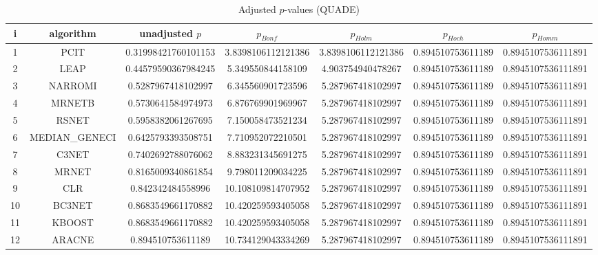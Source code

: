 \documentclass[a4paper,10pt]{article}
\begin{document}
\begin{landscape}
\begin{table}[!htp]
\centering\scriptsize
\caption{Adjusted $p$-values (QUADE)}
\begin{tabular}{ccccccc}
i&algorithm&unadjusted $p$&$p_{Bonf}$&$p_{Holm}$&$p_{Hoch}$&$p_{Homm}$\\
\hline
1&PCIT&0.31998421760101153&3.8398106112121386&3.8398106112121386&0.894510753611189&0.8945107536111891\\
2&LEAP&0.44579590367984245&5.349550844158109&4.903754940478267&0.894510753611189&0.8945107536111891\\
3&NARROMI&0.5287967418102997&6.345560901723596&5.287967418102997&0.894510753611189&0.8945107536111891\\
4&MRNETB&0.5730641584974973&6.876769901969967&5.287967418102997&0.894510753611189&0.8945107536111891\\
5&RSNET&0.5958382061267695&7.150058473521234&5.287967418102997&0.894510753611189&0.8945107536111891\\
6&MEDIAN_GENECI&0.6425793393508751&7.710952072210501&5.287967418102997&0.894510753611189&0.8945107536111891\\
7&C3NET&0.7402692788076062&8.883231345691275&5.287967418102997&0.894510753611189&0.8945107536111891\\
8&MRNET&0.8165009340861854&9.798011209034225&5.287967418102997&0.894510753611189&0.8945107536111891\\
9&CLR&0.842342484558996&10.108109814707952&5.287967418102997&0.894510753611189&0.8945107536111891\\
10&BC3NET&0.8683549661170882&10.420259593405058&5.287967418102997&0.894510753611189&0.8945107536111891\\
11&KBOOST&0.8683549661170882&10.420259593405058&5.287967418102997&0.894510753611189&0.8945107536111891\\
12&ARACNE&0.894510753611189&10.734129043334269&5.287967418102997&0.894510753611189&0.8945107536111891\\
\hline
\end{tabular}
\end{table}


\end{landscape}
\end{document}
